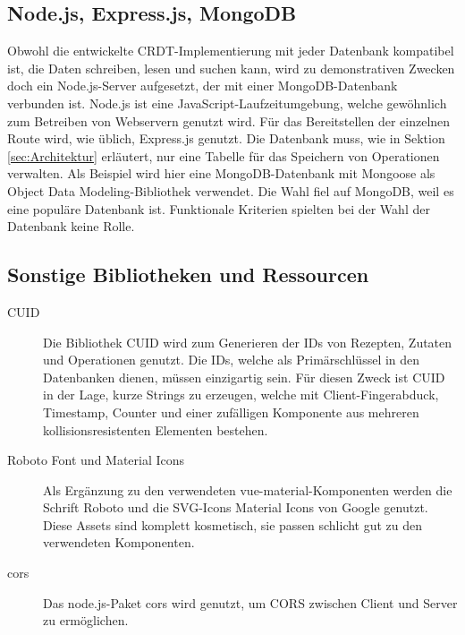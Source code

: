 \documentclass[a4paper, 12pt]{scrreprt}
\begin{document}
\begin{minipage}{\linewidth}
	
\end{minipage}

\begin{minipage}{\linewidth}
	
\end{minipage}

\subsection{Node.js, Express.js, MongoDB}
Obwohl die entwickelte CRDT-Implementierung mit jeder Datenbank kompatibel ist, die Daten schreiben, lesen und suchen kann, wird zu demonstrativen Zwecken doch ein Node.js-Server aufgesetzt, der mit einer MongoDB-Datenbank verbunden ist. Node.js ist eine JavaScript-Laufzeitumgebung, welche gewöhnlich zum Betreiben von Webservern genutzt wird. Für das Bereitstellen der einzelnen Route wird, wie üblich, Express.js genutzt. Die Datenbank muss, wie in Sektion \ref{sec:Architektur} erläutert, nur eine Tabelle für das Speichern von Operationen verwalten. Als Beispiel wird hier eine MongoDB-Datenbank mit Mongoose als Object Data Modeling-Bibliothek verwendet. Die Wahl fiel auf MongoDB, weil es eine populäre Datenbank ist. Funktionale Kriterien spielten bei der Wahl der Datenbank keine Rolle. 

\subsection{Sonstige Bibliotheken und Ressourcen}

\begin{description}
	\item[CUID] Die Bibliothek CUID wird zum Generieren der IDs von Rezepten, Zutaten und Operationen genutzt. Die IDs, welche als Primärschlüssel in den Datenbanken dienen, müssen einzigartig sein. Für diesen Zweck ist CUID in der Lage, kurze Strings zu erzeugen, welche mit Client-Fingerabduck, Timestamp, Counter und einer zufälligen Komponente aus mehreren kollisionsresistenten Elementen bestehen.
	\item[Roboto Font und Material Icons] Als Ergänzung zu den verwendeten vue-material-Komponenten werden die Schrift Roboto und die SVG-Icons Material Icons von Google genutzt. Diese Assets sind komplett kosmetisch, sie passen schlicht gut zu den verwendeten Komponenten.
	\item[cors] Das node.js-Paket cors wird genutzt, um \ac{CORS} zwischen Client und Server zu ermöglichen.
\end{description}
\end{document}

